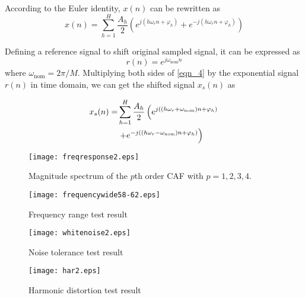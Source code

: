 \documentclass[journal,twoside]{IEEEtran}
\begin{document}
According to the Euler identity, $x(n)$ can be rewritten as
\begin{equation}
x(n)=\sum_{h=1}^{H}\dfrac{A_h}{2}\left(e^{j\left(h\omega_r n+\varphi_h\right)}+e^{-j\left(h\omega_r n+\varphi_h\right)}\right)\label{eqn_4}
\end{equation}



Defining a reference signal to shift original sampled signal, it can be expressed as 
\begin{equation}
r(n)=e^{j\omega_\mathrm{nom}n}\label{eqn_yao}
\end{equation}
where $\omega_\mathrm{nom}=2\pi /M$.
Multiplying both sides of \eqref{eqn_4} by the exponential signal $r(n)$ in time domain, we can get the shifted signal $x_s(n)$ as 

\begin{align}%
x_s(n)=&\sum_{h=1}^{H}\dfrac{A_h}{2}\left(e^{j\left((h\omega_r+\omega_\mathrm{nom})n+\varphi_h\right)}\right.\notag\\
&\left.+e^{-j\left((h\omega_r -\omega_\mathrm{nom})n+\varphi_h\right)}\right)\label{eqn_5}
\end{align}

\begin{figure}[t]
	\centering
	\texttt{[image: freqresponse2.eps]}
	\caption{Magnitude spectrum of the $p$th order CAF with $p=1,2,3,4$.}
	\label{fig_1}										
\end{figure}
\begin{figure}[t]
	\centering
	\texttt{[image: frequencywide58-62.eps]}
\caption{Frequency range test result}
	\label{fig_2}										
\end{figure}
\begin{figure}[t]
	\centering
	\texttt{[image: whitenoise2.eps]}
	\caption{Noise tolerance test result}
	\label{fig_3}						
\end{figure}
\begin{figure}[t]
	\centering
	\texttt{[image: har2.eps]}
	\caption{Harmonic distortion test result}
	\label{fig_4}									
\end{figure}
\end{document}
